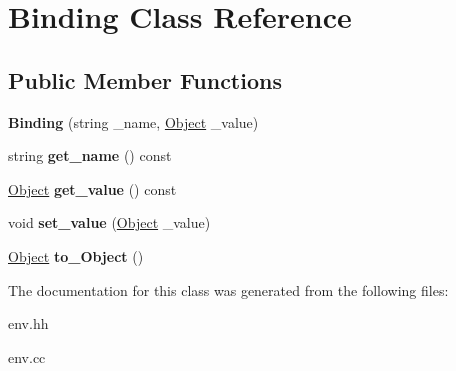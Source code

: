 \hypertarget{classBinding}{\section{Binding Class Reference}
\label{classBinding}
}
\subsection*{Public Member Functions}
\begin{DoxyCompactItemize}
\item 
\hypertarget{classBinding_a8b9c7fbfcd671a4dfe83f44d25cc6340}{{\bfseries Binding} (string \-\_\-name, \hyperlink{classCell}{Object} \-\_\-value)}\label{classBinding_a8b9c7fbfcd671a4dfe83f44d25cc6340}

\item 
\hypertarget{classBinding_ae35d1911d39f4720187f4224e7d63317}{string {\bfseries get\-\_\-name} () const }\label{classBinding_ae35d1911d39f4720187f4224e7d63317}

\item 
\hypertarget{classBinding_a26a8b281ff70dec2b40301a7ab20af35}{\hyperlink{classCell}{Object} {\bfseries get\-\_\-value} () const }\label{classBinding_a26a8b281ff70dec2b40301a7ab20af35}

\item 
\hypertarget{classBinding_ac20925221868117396d735c485b86949}{void {\bfseries set\-\_\-value} (\hyperlink{classCell}{Object} \-\_\-value)}\label{classBinding_ac20925221868117396d735c485b86949}

\item 
\hypertarget{classBinding_a87118b9e2be662c08d9ae464691f675a}{\hyperlink{classCell}{Object} {\bfseries to\-\_\-\-Object} ()}\label{classBinding_a87118b9e2be662c08d9ae464691f675a}

\end{DoxyCompactItemize}


The documentation for this class was generated from the following files\-:\begin{DoxyCompactItemize}
\item 
env.\-hh\item 
env.\-cc\end{DoxyCompactItemize}
